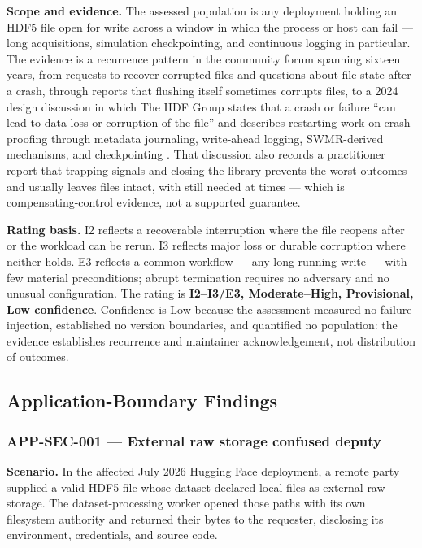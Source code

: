 \documentclass[../main.tex]{subfiles}
\begin{document}
\noindent\textbf{Scope and evidence.}
The assessed population is any deployment holding an HDF5 file open for write
across a window in which the process or host can fail --- long acquisitions,
simulation checkpointing, and continuous logging in particular. The evidence is
a recurrence pattern in the community forum spanning sixteen years, from
requests to recover corrupted files and questions about file state after a
crash, through reports that flushing itself sometimes corrupts files, to a 2024
design discussion in which The HDF Group states that a crash or failure ``can
lead to data loss or corruption of the file'' and describes restarting work on
crash-proofing through metadata journaling, write-ahead logging, SWMR-derived
mechanisms, and checkpointing
\cite{forum-recover-1146,forum-crash-state-1598,forum-crash-prevent-2462,
forum-flush-crash-3481,forum-flush-corrupt-4958,forum-recover-5441,
forum-crash-corruption-7581,forum-crashproofing-12003}. That discussion also
records a practitioner report that trapping signals and closing the library
prevents the worst outcomes and usually leaves files intact, with
 still needed at times --- which is compensating-control
evidence, not a supported guarantee.

\noindent\textbf{Rating basis.}
I2 reflects a recoverable interruption where the file reopens after
 or the workload can be rerun. I3 reflects major loss or durable
corruption where neither holds. E3 reflects a common workflow --- any
long-running write --- with few material preconditions; abrupt termination
requires no adversary and no unusual configuration. The rating is
\textbf{I2--I3/E3, Moderate--High, Provisional, Low confidence}. Confidence is
Low because the assessment measured no failure injection, established no
version boundaries, and quantified no population: the evidence establishes
recurrence and maintainer acknowledgement, not distribution of outcomes.

\subsection{Application-Boundary Findings}

\subsubsection*{APP-SEC-001 --- External raw storage confused deputy}

\noindent\textbf{Scenario.}
In the affected July 2026 Hugging Face deployment, a remote party supplied a
valid HDF5 file whose dataset declared local files as external raw storage. The
dataset-processing worker opened those paths with its own filesystem authority
and returned their bytes to the requester, disclosing its environment,
credentials, and source code.
\end{document}
